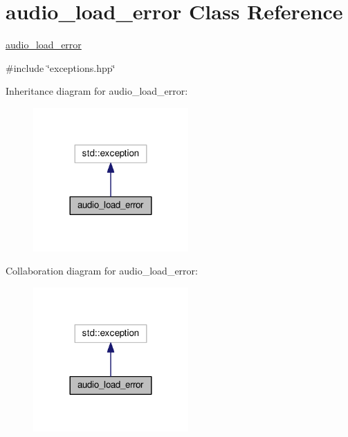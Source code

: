 \hypertarget{classaudio__load__error}{}\section{audio\+\_\+load\+\_\+error Class Reference}
\label{classaudio__load__error}


\hyperlink{classaudio__load__error}{audio\+\_\+load\+\_\+error}  




{\ttfamily \#include \char`\"{}exceptions.\+hpp\char`\"{}}



Inheritance diagram for audio\+\_\+load\+\_\+error\+:\nopagebreak
\begin{figure}[H]
\begin{center}
\leavevmode
\includegraphics[width=168pt]{classaudio__load__error__inherit__graph}
\end{center}
\end{figure}


Collaboration diagram for audio\+\_\+load\+\_\+error\+:\nopagebreak
\begin{figure}[H]
\begin{center}
\leavevmode
\includegraphics[width=168pt]{classaudio__load__error__coll__graph}
\end{center}
\end{figure}
